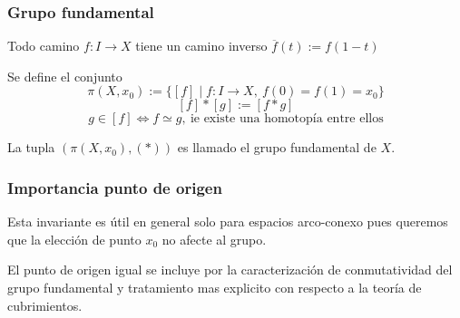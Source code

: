 \documentclass[xetex,mathserif,serif]{beamer}
\begin{document}
  \begin{frame}
    \frametitle{Grupo fundamental}
    \begin{block}{}
      Todo camino \(f : I \to X\) tiene un camino inverso \(\overline f (t)
      := f( 1 - t)\)
    \end{block}
    \begin{block}{}
      Se define el conjunto
      \[ \pi (X, x_0) := \{ [f] \mid f : I \to X ,\ f(0) = f(1) = x_0
        \} \]
      \[ [f] * [g] := [f * g]\]
      \[ g \in [f] \iff f \simeq g ,\ \text{ie existe una homotopía
          entre ellos}\]
    \end{block}

    \begin{block}{}
      La tupla \(
      \left(\pi(X, x_0), (*) \right) \) es llamado el grupo fundamental de \(X\).
    \end{block}
  \end{frame}

  \begin{frame}
    \frametitle{Importancia punto de origen}
    \begin{block}{}
      Esta invariante es útil en general solo para espacios arco-conexo
      pues queremos que la elección de punto \(x_0\) no afecte al grupo.
    \end{block}

    \pause

    \begin{block}{}
      El punto de origen igual se incluye por la caracterización de
      conmutatividad del grupo fundamental y tratamiento mas explicito con
      respecto a la teoría de cubrimientos.
    \end{block}
  \end{frame}
\end{document}
